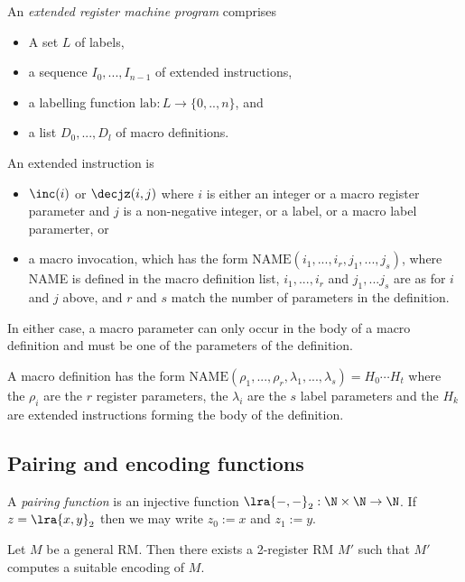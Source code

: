\documentclass{article}
\begin{document}
\begin{definition}[Notes I.3]
	An \emph{extended register machine program} comprises
	\begin{itemize}
		\item A set $L$ of labels,
		\item a sequence $I_0,...,I_{n-1}$ of extended instructions,
		\item a labelling function $\text{lab}:L\to\{0,..,n\}$, and
		\item a list $D_0,...,D_l$ of macro definitions.
	\end{itemize}
	An extended instruction is
	\begin{itemize}
		\item $\inc(i)$ or $\decjz(i,j)$ where $i$ is either an integer or a macro
		      register parameter and $j$ is a non-negative integer, or a label, or
		      a macro label paramerter, or
		\item a macro invocation, which has the form $\text{NAME}(i_1,...,i_r,j_1,...,j_s)$,
		      where NAME is defined in the macro definition list, $i_1,...,i_r$ and $j_1,...j_s$
		      are as for $i$ and $j$ above, and $r$ and $s$ match the number of parameters
		      in the definition.
	\end{itemize}
	In either case, a macro parameter can only occur in the body of a macro definition
	and must be one of the parameters of the definition.

	A macro definition has the form $\text{NAME}(\rho_1,...,\rho_r,\lambda_1,...,\lambda_s)=H_0\cdots H_t$
	where the $\rho_i$ are the $r$ register parameters, the $\lambda_i$ are the $s$
	label parameters and the $H_k$ are extended instructions forming the body of the
	definition.
\end{definition}

\subsection{Pairing and encoding functions}

\begin{definition}[Notes I.5]
	A \emph{pairing function} is an injective function $\lra{-,-}_2:\N\times\N\to\N$.
	If $z=\lra{x,y}_2$ then we may write $z_0:=x$ and $z_1:=y$.
\end{definition}

\begin{theorem}
	Let $M$ be a general RM. Then there exists a 2-register RM $M'$ such that
	$M'$ computes a suitable encoding of $M$.
\end{theorem}
\end{document}
